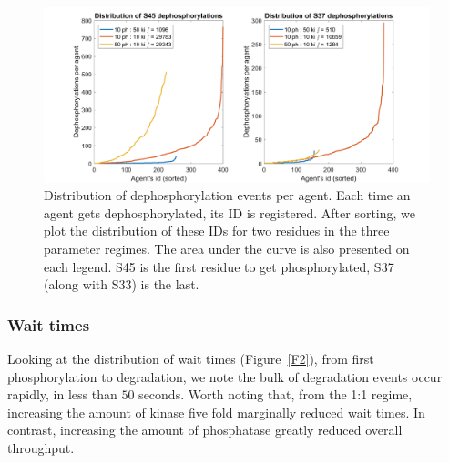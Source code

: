\begin{figure}[h]
  \centering
  \includegraphics[width=\columnwidth]{wnt/F1_distribution_dephosphorylations_per_agent_brief.png}
  \caption{Distribution of dephosphorylation events per agent. Each
    time an agent gets dephosphorylated, its ID is registered. After
    sorting, we plot the distribution of these IDs for two
    residues in the three parameter regimes. The area under the curve
    is also presented on each legend. S45 is the first residue to get
		phosphorylated, S37 (along with S33) is the last.}
  \label{F1}
\end{figure}


\subsubsection*{Wait times}
Looking at the distribution of wait times (Figure~\ref{F2}), from first phosphorylation
to degradation, we note the bulk of degradation events occur rapidly,
in less than $50$ seconds. Worth noting that, from the 1:1 regime,
increasing the amount of kinase five fold marginally reduced wait
times. In contrast, increasing the amount of phosphatase greatly reduced overall throughput.

